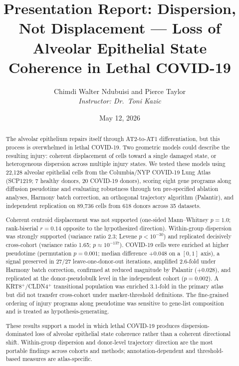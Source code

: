 \documentclass[11pt,a4paper]{article}
\title{Presentation Report: Dispersion, Not Displacement --- Loss of Alveolar Epithelial State Coherence in Lethal COVID-19}
\author{Chimdi Walter Ndubuisi and Pierce Taylor\\[0.5em]
\textit{Instructor: Dr.\ Toni Kazic}}
\date{May 12, 2026}
\begin{document}
\maketitle

\begin{abstract}
The alveolar epithelium repairs itself through AT2-to-AT1 differentiation, but
this process is overwhelmed in lethal COVID-19. Two geometric models could
describe the resulting injury: coherent displacement of cells toward a single
damaged state, or heterogeneous dispersion across multiple injury states. We
tested these models using 22,128 alveolar epithelial cells from the Columbia/NYP
COVID-19 Lung Atlas (SCP1219; 7 healthy donors, 20 COVID-19 donors), scoring
eight gene programs along diffusion pseudotime and evaluating robustness through
ten pre-specified ablation analyses, Harmony batch correction, an orthogonal
trajectory algorithm (Palantir), and independent replication on 89,736 cells from
618 donors across 35 datasets.

Coherent centroid displacement was not supported (one-sided Mann--Whitney
$p = 1.0$; rank-biserial $r = 0.14$ opposite to the hypothesized direction).
Within-group dispersion was strongly supported (variance ratio 2.3; Levene
$p < 10^{-30}$) and replicated decisively cross-cohort (variance ratio 1.65;
$p \approx 10^{-137}$). COVID-19 cells were enriched at higher pseudotime
(permutation $p = 0.001$; median difference $+0.048$ on a $[0,1]$ axis), a
signal preserved in 27/27 leave-one-donor-out iterations, amplified 2.6-fold
under Harmony batch correction, confirmed at reduced magnitude by Palantir
($+0.028$), and replicated at the donor-pseudobulk level in the independent
cohort ($p = 0.002$). A KRT8$^+$/CLDN4$^+$ transitional population was enriched
3.1-fold in the primary atlas but did not transfer cross-cohort under
marker-threshold definitions. The fine-grained ordering of injury programs along
pseudotime was sensitive to gene-list composition and is treated as
hypothesis-generating.

These results support a model in which lethal COVID-19 produces
dispersion-dominated loss of alveolar epithelial state coherence rather than a
coherent directional shift. Within-group dispersion and donor-level trajectory
direction are the most portable findings across cohorts and methods;
annotation-dependent and threshold-based measures are atlas-specific.
\end{abstract}

\tableofcontents
\newpage
\end{document}
